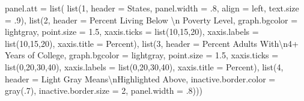 \documentclass[
]{krantz}
\makeatletter
\newenvironment{Shaded}{\begin{snugshade}}{\end{snugshade}}
\newcommand{\AttributeTok}[1]{\textcolor[rgb]{0.61,0.61,0.61}{#1}}
\newcommand{\DecValTok}[1]{\textcolor[rgb]{0.06,0.06,0.06}{#1}}
\newcommand{\FloatTok}[1]{\textcolor[rgb]{0.06,0.06,0.06}{#1}}
\newcommand{\FunctionTok}[1]{\textcolor[rgb]{0,0,0}{#1}}
\newcommand{\NormalTok}[1]{#1}
\newcommand{\SpecialCharTok}[1]{\textcolor[rgb]{0,0,0}{#1}}
\newcommand{\StringTok}[1]{\textcolor[rgb]{0.5,0.5,0.5}{#1}}
\newenvironment{kframe}{%
\medskip{}
\setlength{\fboxsep}{.8em}
 \def\at@end@of@kframe{}%
 \ifinner\ifhmode%
  \def\at@end@of@kframe{\end{minipage}}%
  \begin{minipage}{\columnwidth}%
 \fi\fi%
 \def\FrameCommand##1{\hskip\@totalleftmargin \hskip-\fboxsep
 \colorbox{shadecolor}{##1}\hskip-\fboxsep
     \hskip-\linewidth \hskip-\@totalleftmargin \hskip\columnwidth}%
 \MakeFramed {\advance\hsize-\width
   \@totalleftmargin\z@ \linewidth\hsize
   \@setminipage}}%
 {\par\unskip\endMakeFramed%
 \at@end@of@kframe}
\renewenvironment{Shaded}{\begin{kframe}}{\end{kframe}}
\makeatother
\begin{document}
\begin{Shaded}
\begin{Highlighting}[]
    \AttributeTok{panel.att =} \FunctionTok{list}\NormalTok{(}
        \FunctionTok{list}\NormalTok{(}\DecValTok{1}\NormalTok{, }\AttributeTok{header =} \StringTok{\textquotesingle{}States\textquotesingle{}}\NormalTok{, }\AttributeTok{panel.width =}\NormalTok{ .}\DecValTok{8}\NormalTok{, }\AttributeTok{align =} \StringTok{\textquotesingle{}left\textquotesingle{}}\NormalTok{, }
          \AttributeTok{text.size =}\NormalTok{ .}\DecValTok{9}\NormalTok{),}
            \FunctionTok{list}\NormalTok{(}\DecValTok{2}\NormalTok{, }\AttributeTok{header =} \StringTok{\textquotesingle{}Percent Living Below }\SpecialCharTok{\textbackslash{}n}\StringTok{ Poverty Level\textquotesingle{}}\NormalTok{,}
                \AttributeTok{graph.bgcolor =} \StringTok{\textquotesingle{}lightgray\textquotesingle{}}\NormalTok{, }\AttributeTok{point.size =} \FloatTok{1.5}\NormalTok{,}
                \AttributeTok{xaxis.ticks =} \FunctionTok{list}\NormalTok{(}\DecValTok{10}\NormalTok{,}\DecValTok{15}\NormalTok{,}\DecValTok{20}\NormalTok{), }\AttributeTok{xaxis.labels =} \FunctionTok{list}\NormalTok{(}\DecValTok{10}\NormalTok{,}\DecValTok{15}\NormalTok{,}\DecValTok{20}\NormalTok{),}
                \AttributeTok{xaxis.title =} \StringTok{\textquotesingle{}Percent\textquotesingle{}}\NormalTok{),}
            \FunctionTok{list}\NormalTok{(}\DecValTok{3}\NormalTok{, }\AttributeTok{header =} \StringTok{\textquotesingle{}Percent Adults With}\SpecialCharTok{\textbackslash{}n}\StringTok{4+ Years of College\textquotesingle{}}\NormalTok{,}
                \AttributeTok{graph.bgcolor =} \StringTok{\textquotesingle{}lightgray\textquotesingle{}}\NormalTok{, }\AttributeTok{point.size =} \FloatTok{1.5}\NormalTok{,}
                \AttributeTok{xaxis.ticks =} \FunctionTok{list}\NormalTok{(}\DecValTok{0}\NormalTok{,}\DecValTok{20}\NormalTok{,}\DecValTok{30}\NormalTok{,}\DecValTok{40}\NormalTok{), }\AttributeTok{xaxis.labels =} \FunctionTok{list}\NormalTok{(}\DecValTok{0}\NormalTok{,}\DecValTok{20}\NormalTok{,}\DecValTok{30}\NormalTok{,}\DecValTok{40}\NormalTok{),}
                \AttributeTok{xaxis.title =} \StringTok{\textquotesingle{}Percent\textquotesingle{}}\NormalTok{),}
            \FunctionTok{list}\NormalTok{(}\DecValTok{4}\NormalTok{, }\AttributeTok{header =} \StringTok{\textquotesingle{}Light Gray Means}\SpecialCharTok{\textbackslash{}n}\StringTok{Highlighted Above\textquotesingle{}}\NormalTok{,  }
                \AttributeTok{inactive.border.color =} \FunctionTok{gray}\NormalTok{(.}\DecValTok{7}\NormalTok{), }\AttributeTok{inactive.border.size =} \DecValTok{2}\NormalTok{, }
                \AttributeTok{panel.width =}\NormalTok{ .}\DecValTok{8}\NormalTok{)))}
\end{Highlighting}
\end{Shaded}
\end{document}
